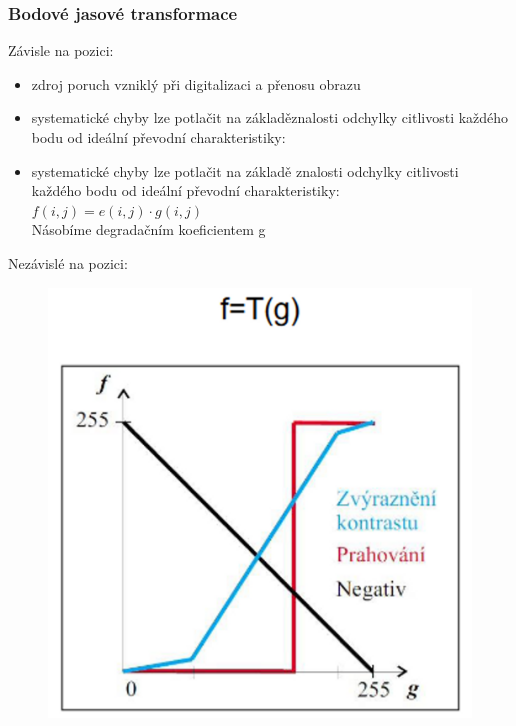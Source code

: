 \subsubsection{Bodové jasové transformace}
Závisle na pozici:
\begin{itemize}
    \item zdroj poruch vzniklý při digitalizaci a přenosu obrazu
    \item systematické chyby lze potlačit na základěznalosti odchylky citlivosti každého bodu od ideální převodní charakteristiky:
    \item systematické chyby lze potlačit na základě  znalosti odchylky citlivosti každého bodu od ideální převodní charakteristiky:
          $f(i,j) = e(i,j)\cdot g(i,j)$\\
          Násobíme degradačním koeficientem g
\end{itemize}
\newpage
Nezávislé na pozici:
\begin{figure}[H]
    \includegraphics[scale = 0.13]{images/transf_krivka.png}
\end{figure}

